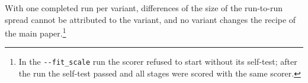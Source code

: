 With one completed run per variant, differences of the size of the run-to-run spread cannot be attributed to the variant, and no variant changes the recipe of the main paper.\footnote{In the \texttt{-{}-fit\_scale} run the scorer refused to start without its self-test; after the run the self-test passed and all stages were scored with the same scorer.}



